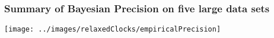 \begin{frame}
\frametitle{Summary of Bayesian Precision on five large data sets}

\begin{centering}

\texttt{[image: ../images/relaxedClocks/empiricalPrecision]}

\end{centering}

\end{frame}